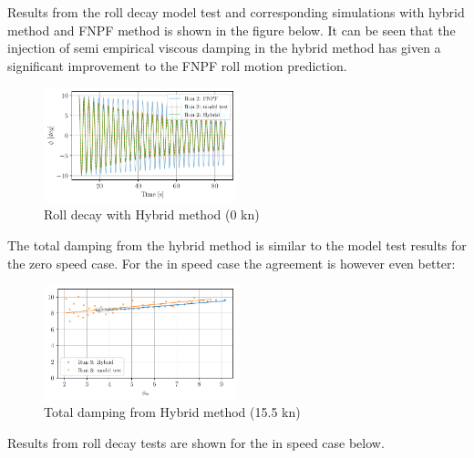    Results from the roll decay model test and corresponding simulations
with hybrid method and FNPF method is shown in the figure below. It can
be seen that the injection of semi empirical viscous damping in the
hybrid method has given a significant improvement to the FNPF roll
motion prediction.

    \begin{figure}[H]
        \begin{center}\includegraphics[width = 0.5\textwidth]{figures/hybrid_0_time.pdf}\end{center}
        \vspace{-1cm}
        \caption{Roll decay with Hybrid method (0 kn)}
        \label{fig:hybrid_0_time}
    \end{figure}
    
    The total damping from the hybrid method is similar to the model test
results for the zero speed case. For the in speed case the agreement is
however even better:

    \begin{figure}[H]
        \begin{center}\includegraphics[width = 0.5\textwidth]{figures/hybrid_speed_amplitudes.pdf}\end{center}
        \vspace{-1cm}
        \caption{Total damping from Hybrid method (15.5 kn)}
        \label{fig:hybrid_speed_amplitudes}
    \end{figure}
    
    Results from roll decay tests are shown for the in speed case below.

